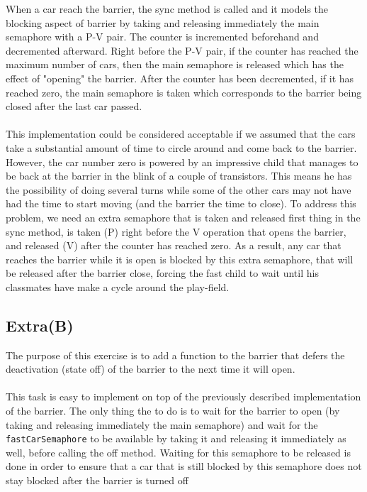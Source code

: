 When a car reach the barrier, the sync method is called and it models the
blocking aspect of barrier by taking and releasing immediately the main
semaphore with a P-V pair. The counter is incremented beforehand and decremented
afterward. Right before the P-V pair, if the counter has reached the
maximum number of cars, then the main semaphore is released which has the effect
of "opening" the barrier. After the counter has been decremented, if it has
reached zero, the main semaphore is taken which corresponds to the barrier being
closed after the last car passed.\\
~\\
This implementation could be considered acceptable if we assumed that the cars 
take a substantial amount of time to circle around and come back to the barrier.
However, the car number zero is powered by an impressive child that manages to
be back at the barrier in the blink of a couple of transistors. This means he
has the possibility of doing several turns while some of the other cars may not
have had the time to start moving (and the barrier the time to close). To
address this problem, we need an extra semaphore that is taken and released
first thing in the sync method, is taken (P) right before the V operation that
opens the barrier, and released (V) after the counter has reached zero. As a
result, any car that reaches the barrier while it is open is blocked by this
extra semaphore, that will be released after the barrier close, forcing the fast
child to wait until his classmates have make a cycle around the play-field.


\subsection{Extra(B)}

The purpose of this exercise is to add a function to the barrier that defers the
deactivation (state off) of the barrier to the next time it will open.\\
~\\
This task is easy to implement on top of the previously described implementation of the barrier. The only thing the to do is to wait for the barrier to open (by
taking and releasing immediately the main semaphore) and wait for the
\texttt{fastCarSemaphore} to be available by taking it and releasing it
immediately as well, before calling the off method. Waiting for this semaphore
to be released is done in order to ensure that a car that is still blocked 
by this semaphore does not stay blocked after the barrier is turned off
